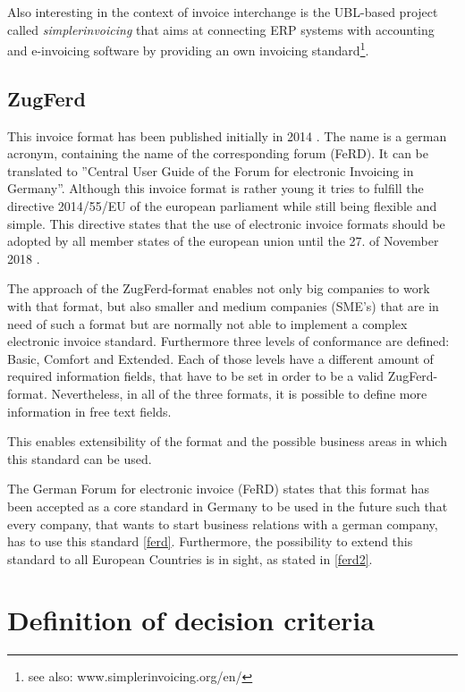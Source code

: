 Also interesting in the context of invoice interchange is the UBL-based project called \emph{simplerinvoicing} that aims at connecting ERP systems with accounting and e-invoicing software by providing an own invoicing standard\footnote {see also: www.simplerinvoicing.org/en/}. 

\subsection{ZugFerd}
\label{sec.2.1.4}

This invoice format has been published initially in 2014 \cite{ferdIntro}. The name is a german acronym, containing the name of the corresponding forum (FeRD). It can be translated to ''Central User Guide of the Forum for electronic Invoicing in Germany''. 
Although this invoice format is rather young it tries to fulfill the directive 2014/55/EU of the european parliament \cite{dir1455} while still being flexible and simple. This directive states that the use of electronic invoice formats should be adopted by all member states of the european union until the 27. of November 2018 \cite{dir1455, Article 11}. 
 
The approach of the ZugFerd-format enables not only big companies to work with that format, but also smaller and medium companies (SME's) that are in need of such a format but are normally not able to implement a complex electronic invoice standard. 
Furthermore three levels of conformance are defined: Basic, Comfort and Extended. Each of those levels have a different amount of required information fields, that have to be set in order to be a valid ZugFerd-format. Nevertheless, in all of the three formats, it is possible to define more information in free text fields. 

This enables extensibility of the format and the possible business areas in which this standard can be used.

The German Forum for electronic invoice (FeRD) states that this format has been accepted as a core standard in Germany to be used in the future such that every company, that wants to start business relations with a german company, has to use this standard \ref{ferd}. Furthermore, the possibility to extend this standard to all European Countries is in sight, as stated in \ref{ferd2}.

\section{Definition of decision criteria}
\label{sec2.2}

